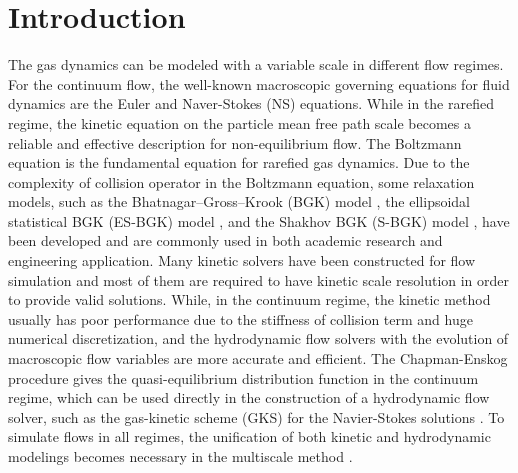 \documentclass[3p,12pt]{elsarticle}
\begin{document}
	
	\section{Introduction}
	The gas dynamics can be modeled with a variable scale in different flow regimes.
	For the continuum flow, the well-known macroscopic governing equations for fluid dynamics are the Euler and Naver-Stokes (NS) equations.
	While in the rarefied regime, the kinetic equation on the particle mean free path scale becomes a reliable and effective description for non-equilibrium flow.
	The Boltzmann equation \cite{boltzmann2012lectures} is the fundamental equation for rarefied gas dynamics.
	Due to the complexity of collision operator in the Boltzmann equation, some relaxation models, such as the Bhatnagar--Gross--Krook (BGK) model \cite{BGK1954}, the ellipsoidal statistical BGK (ES-BGK) model \cite{holway1966new}, and the Shakhov BGK (S-BGK) model \cite{shakhov1968generalization}, have been developed and are commonly used in both academic research and engineering application.
	Many kinetic solvers have been constructed for flow simulation and most of them are required to have kinetic scale resolution in order to
provide valid solutions.
	While, in the continuum regime, the kinetic method usually has poor performance due to the stiffness of collision term and huge numerical discretization, and the hydrodynamic flow solvers with the evolution of macroscopic flow variables are more accurate and efficient.
	The Chapman-Enskog procedure \cite{chapman1990mathematical} gives the quasi-equilibrium distribution function in the continuum regime, which can be used directly in the construction of a hydrodynamic flow solver, such as the gas-kinetic scheme (GKS) for the Navier-Stokes solutions \cite{xu2001}.
	To simulate flows in all regimes, the unification of both kinetic and hydrodynamic modelings becomes necessary in the multiscale method \cite{xu-book}.
	
\end{document}
